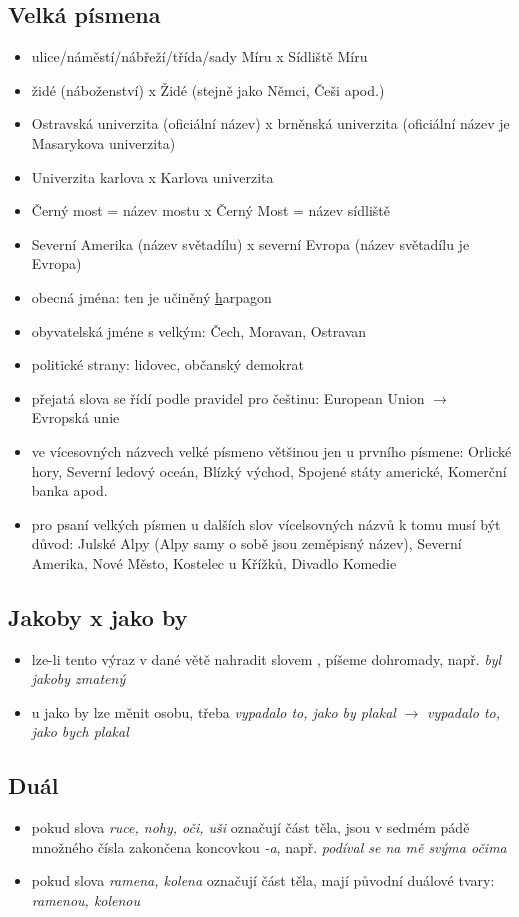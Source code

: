 \documentclass{memoir}
\begin{document}
\subsection*{Velká písmena}
\begin{itemize}
\item ulice/náměstí/nábřeží/třída/sady Míru x Sídliště Míru
\item židé (náboženství) x Židé (stejně jako Němci, Češi apod.)
\item Ostravská univerzita (oficiální název) x brněnská univerzita (oficiální název je Masarykova univerzita)
\item Univerzita karlova x Karlova univerzita
\item Černý most = název mostu x Černý Most = název sídliště
\item Severní Amerika (název světadílu) x severní Evropa (název světadílu je Evropa)
\item obecná jména: ten je učiněný \underline{h}arpagon
\item obyvatelská jméne s velkým: Čech, Moravan, Ostravan
\item politické strany: lidovec, občanský demokrat
\item přejatá slova se řídí podle pravidel pro češtinu: European Union $\rightarrow$ Evropská unie
\item ve vícesovných názvech velké písmeno většinou jen u prvního písmene: Orlické hory, Severní ledový oceán, Blízký východ, Spojené státy americké, Komerční banka apod.
\item pro psaní velkých písmen u dalších slov vícelsovných názvů k tomu musí být důvod: Julské Alpy (Alpy samy o sobě jsou zeměpisný název), Severní Amerika, Nové Město, Kostelec u Křížků, Divadlo Komedie
\end{itemize}

\subsection*{Jakoby x jako by}
\begin{itemize}
\item lze-li tento výraz v dané větě nahradit slovem , píšeme dohromady, např. \textit{byl jakoby zmatený}
\item u jako by lze měnit osobu, třeba \textit{vypadalo to, jako by plakal} $\rightarrow$ \textit{vypadalo to, jako bych plakal}
\end{itemize}

\subsection*{Duál}
\begin{itemize}
\item pokud slova \textit{ruce, nohy, oči, uši} označují část těla, jsou v sedmém pádě množného čísla zakončena koncovkou \textit{-a}, např. \textit{podíval se na mě svýma očima}
\item pokud slova \textit{ramena, kolena} označují část těla, mají původní duálové tvary: \textit{ramenou, kolenou}
\end{itemize}
\end{document}
